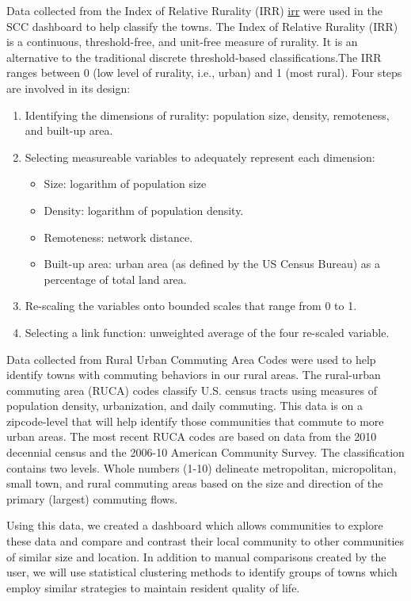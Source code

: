 \documentclass[letterpaper,inpress]{jdsart}
\begin{document}
Data collected from the Index of Relative Rurality (IRR) \url{irr} were used in the SCC dashboard to help classify the towns. The Index of Relative Rurality (IRR) is a continuous, threshold-free, and unit-free measure of rurality. It is an alternative to the traditional discrete threshold-based classifications.The IRR ranges between 0 (low level of rurality, i.e., urban) and 1 (most rural). Four steps are involved in its design:

\begin{enumerate}
\item Identifying the dimensions of rurality: population size, density, remoteness, and built-up area.
\item Selecting measureable variables to adequately represent each dimension:
    \begin{itemize}
        \item Size: logarithm of population size
        \item Density: logarithm of population density.
        \item Remoteness: network distance.
        \item Built-up area: urban area (as defined by the US Census Bureau) as a percentage of total land area.
    \end{itemize}
\item Re-scaling the variables onto bounded scales that range from 0 to 1.
\item Selecting a link function: unweighted average of the four re-scaled variable.
\end{enumerate}

Data collected from Rural Urban Commuting Area Codes \citet{usda} were used to help identify towns with commuting behaviors in our rural areas. The rural-urban commuting area (RUCA) codes classify U.S. census tracts using measures of population density, urbanization, and daily commuting. This data is on a zipcode-level that will help identify those communities that commute to more urban areas. The most recent RUCA codes are based on data from the 2010 decennial census and the 2006-10 American Community Survey. The classification contains two levels. Whole numbers (1-10) delineate metropolitan, micropolitan, small town, and rural commuting areas based on the size and direction of the primary (largest) commuting flows.

Using this data, we created a dashboard which allows communities to explore these data and compare and contrast their local community to other communities of similar size and location. In addition to manual comparisons created by the user, we will use statistical clustering methods to identify groups of towns which employ similar strategies to maintain resident quality of life.
\end{document}
